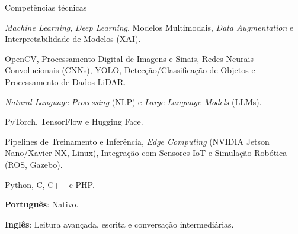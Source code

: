 
\begin{rubric}{Competências técnicas}

  \textit{Machine Learning}, \textit{Deep Learning}, Modelos Multimodais, \textit{Data Augmentation} e Interpretabilidade de Modelos (XAI).
\cvdivider

  OpenCV, Processamento Digital de Imagens e Sinais, Redes Neurais Convolucionais (CNNs), YOLO, Detecção/Classificação de Objetos e Processamento de Dados LiDAR.
\cvdivider

  \textit{Natural Language Processing} (NLP) e \textit{Large Language Models} (LLMs).
\cvdivider

\entry*[Frameworks]
  PyTorch, TensorFlow e Hugging Face.
\cvdivider

  Pipelines de Treinamento e Inferência, \textit{Edge Computing} (NVIDIA Jetson Nano/Xavier NX, Linux), Integração com Sensores IoT e Simulação Robótica (ROS, Gazebo).
\cvdivider

\entry*[Programação]
  Python, C, C++ e PHP.
\cvdivider

\entry*[Idiomas]
  \textbf{Português}: Nativo.
  \par \textbf{Inglês}: Leitura avançada, escrita e conversação intermediárias.

\end{rubric}
